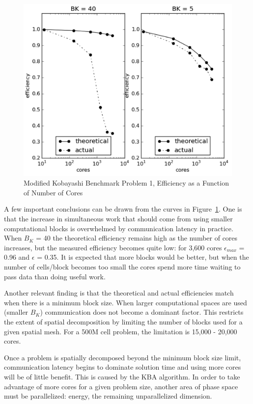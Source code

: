 \begin{figure}[!h]
  \begin{center}
    \includegraphics [width=.85\textwidth, height=0.5\textheight ] {JagBlockStudy}
  \end{center}
  \caption{Modified Kobayashi Benchmark Problem 1, Efficiency as a Function of Number of Cores}
  \label{fig:JagBlockStudy}
\end{figure}

A few important conclusions can be drawn from the curves in Figure~\ref{fig:JagBlockStudy}. One is that the increase in simultaneous work that should come from using smaller computational blocks is overwhelmed by communication latency in practice. When $B_{K}$ = 40 the theoretical efficiency remains high as the number of cores increases, but the measured efficiency becomes quite low: for 3,600 cores $\epsilon_{max}$ = 0.96 and $\epsilon$ = 0.35. It is expected that more blocks would be better, but when the number of cells/block becomes too small the cores spend more time waiting to pass data than doing useful work. 

Another relevant finding is that the theoretical and actual efficiencies match when there is a minimum block size. When larger computational spaces are used (smaller $B_{K}$) communication does not become a dominant factor. This restricts the extent of spatial decomposition by limiting the number of blocks used for a given spatial mesh. For a 500M cell problem, the limitation is 15,000 - 20,000 cores. 

Once a problem is spatially decomposed beyond the minimum block size limit, communication latency begins to dominate solution time and using more cores will be of little benefit. This is caused by the KBA algorithm. In order to take advantage of more cores for a given problem size, another area of phase space must be parallelized: energy, the remaining unparallelized dimension. 

